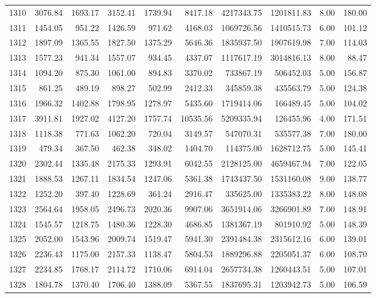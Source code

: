 \begin{tabular}{lrrrrrrrrr}
1310 & 3076.84 & 1693.17 & 3152.41 & 1739.94 & 8417.18 & 4217343.75 & 1201811.83 & 8.00 & 180.00 \\
1311 & 1454.05 & 951.22 & 1426.59 & 971.62 & 4168.03 & 1069726.56 & 1410515.73 & 6.00 & 101.12 \\
1312 & 1897.09 & 1365.55 & 1827.50 & 1375.29 & 5646.36 & 1835937.50 & 1907619.98 & 7.00 & 114.03 \\
1313 & 1577.23 & 941.34 & 1557.07 & 934.45 & 4337.07 & 1117617.19 & 3014816.13 & 8.00 & 88.47 \\
1314 & 1094.20 & 875.30 & 1061.00 & 894.83 & 3370.02 & 733867.19 & 506452.03 & 5.00 & 156.87 \\
1315 & 861.25 & 489.19 & 898.27 & 502.99 & 2412.33 & 345859.38 & 435563.79 & 5.00 & 124.38 \\
1316 & 1966.32 & 1402.88 & 1798.95 & 1278.97 & 5435.60 & 1719414.06 & 166489.45 & 5.00 & 104.02 \\
1317 & 3911.81 & 1927.02 & 4127.20 & 1757.74 & 10535.56 & 5209335.94 & 126455.96 & 4.00 & 171.51 \\
1318 & 1118.38 & 771.63 & 1062.20 & 720.04 & 3149.57 & 547070.31 & 535577.38 & 7.00 & 180.00 \\
1319 & 479.34 & 367.50 & 462.38 & 348.02 & 1404.70 & 114375.00 & 1628712.75 & 5.00 & 145.41 \\
1320 & 2302.44 & 1335.48 & 2175.33 & 1293.91 & 6042.55 & 2128125.00 & 4659467.94 & 7.00 & 122.05 \\
1321 & 1888.53 & 1267.11 & 1834.54 & 1247.06 & 5361.38 & 1743437.50 & 1531160.08 & 9.00 & 138.77 \\
1322 & 1252.20 & 397.40 & 1228.69 & 361.24 & 2916.47 & 335625.00 & 1335383.22 & 8.00 & 148.08 \\
1323 & 2564.64 & 1958.05 & 2496.73 & 2020.36 & 9907.06 & 3651914.06 & 3266901.89 & 7.00 & 148.91 \\
1324 & 1545.57 & 1218.75 & 1480.36 & 1228.30 & 4686.85 & 1381367.19 & 801910.92 & 5.00 & 148.39 \\
1325 & 2052.00 & 1543.96 & 2009.74 & 1519.47 & 5941.30 & 2391484.38 & 2315612.16 & 6.00 & 139.01 \\
1326 & 2236.43 & 1175.00 & 2157.33 & 1138.47 & 5804.53 & 1889296.88 & 2205051.37 & 6.00 & 108.70 \\
1327 & 2234.85 & 1768.17 & 2114.72 & 1710.06 & 6914.04 & 2657734.38 & 1260443.51 & 5.00 & 107.01 \\
1328 & 1804.78 & 1370.40 & 1706.40 & 1388.09 & 5367.55 & 1837695.31 & 1203942.73 & 5.00 & 106.59 \\

\end{tabular}
